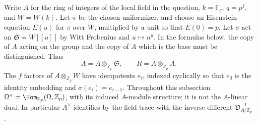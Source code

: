 Write $A$ for the ring of integers of the local field in the question, $k=\mathbb F_q$, $q=p^f$, and $W=W(k)$.  Let $\pi$ be the chosen uniformizer, and choose an Eisenstein equation $E(u)$ for $\pi$ over $W$, multiplied by a unit so that $E(0)=p$.  Let $\sigma$ act on $\mathfrak S=W[[u]]$ by Witt Frobenius and $u\mapsto u^p$.  In the formulas below, the copy of $A$ acting on the group and the copy of $A$ which is the base must be distinguished.  Thus
\[
 \Lambda=A\otimes_{\mathbb Z_p}\mathfrak S,
 \qquad R=A\otimes_{\mathbb Z_p}A.
\]
The $f$ factors of $A\otimes_{\mathbb Z_p}W$ have idempotents $e_i$, indexed cyclically so that $e_0$ is the identity embedding and $\sigma(e_i)=e_{i-1}$.  Throughout this subsection $\Omega^\vee=\Hom_{\mathbb Z_p}(\Omega,\mathbb Z_p)$, with its induced $A$-module structure; it is not the $A$-linear dual.  In particular $A^\vee$ identifies by the field trace with the inverse different $\mathfrak D_{A/\mathbb Z_p}^{-1}$.

